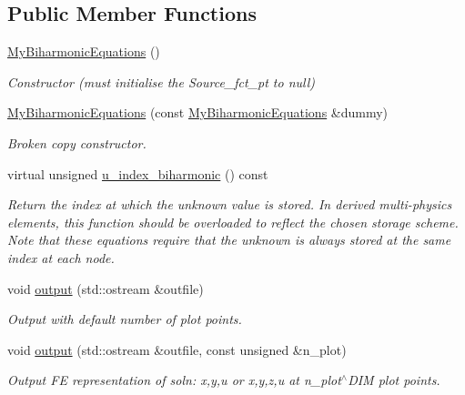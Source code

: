 \subsection*{Public Member Functions}
\begin{DoxyCompactItemize}
\item 
\hyperlink{classoomph_1_1MyBiharmonicEquations_ab5084decf9d75cee91f0e88fb4f62c86}{My\+Biharmonic\+Equations} ()
\begin{DoxyCompactList}\small\item\em Constructor (must initialise the Source\+\_\+fct\+\_\+pt to null) \end{DoxyCompactList}\item 
\hyperlink{classoomph_1_1MyBiharmonicEquations_a3cf0e0a63e46219b94195aa4ab926316}{My\+Biharmonic\+Equations} (const \hyperlink{classoomph_1_1MyBiharmonicEquations}{My\+Biharmonic\+Equations} \&dummy)
\begin{DoxyCompactList}\small\item\em Broken copy constructor. \end{DoxyCompactList}\item 
virtual unsigned \hyperlink{classoomph_1_1MyBiharmonicEquations_aecad5ed2e1534519b81e778c5dff6457}{u\+\_\+index\+\_\+biharmonic} () const
\begin{DoxyCompactList}\small\item\em Return the index at which the unknown value is stored. In derived multi-\/physics elements, this function should be overloaded to reflect the chosen storage scheme. Note that these equations require that the unknown is always stored at the same index at each node. \end{DoxyCompactList}\item 
void \hyperlink{classoomph_1_1MyBiharmonicEquations_aa0d1248dcc8fcebd986c295d6af2ebf6}{output} (std\+::ostream \&outfile)
\begin{DoxyCompactList}\small\item\em Output with default number of plot points. \end{DoxyCompactList}\item 
void \hyperlink{classoomph_1_1MyBiharmonicEquations_a9a2734695e94f83eb6d553a7090dbebd}{output} (std\+::ostream \&outfile, const unsigned \&n\+\_\+plot)
\begin{DoxyCompactList}\small\item\em Output FE representation of soln\+: x,y,u or x,y,z,u at n\+\_\+plot$^\wedge$\+D\+IM plot points. \end{DoxyCompactList}\item 

\end{DoxyCompactItemize}
